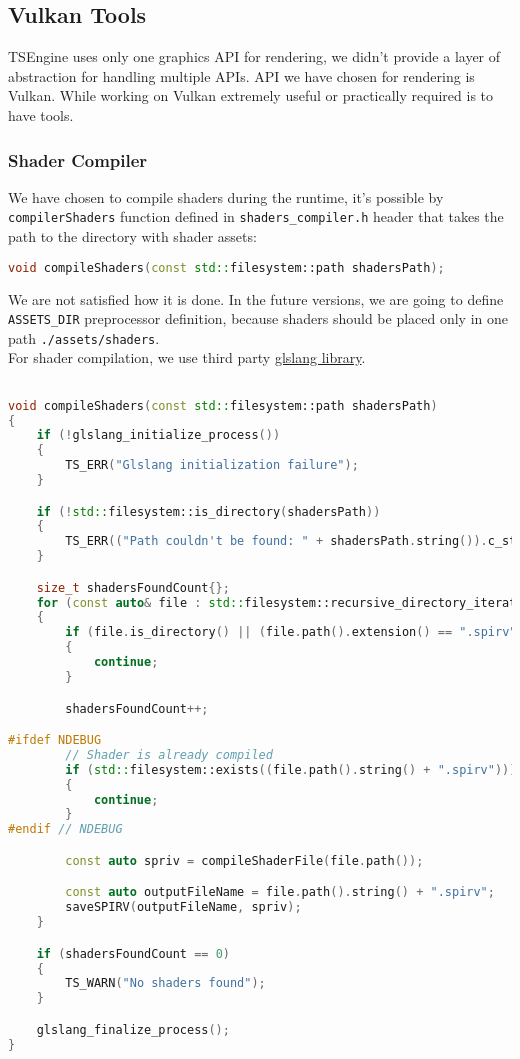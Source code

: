 \newpage

\subsection{Vulkan Tools}
TSEngine uses only one graphics API for rendering, we didn't provide a layer of abstraction for handling multiple APIs. API we have chosen for rendering is Vulkan. While working on Vulkan extremely useful or practically required is to have tools.
\subsubsection{Shader Compiler}
We have chosen to compile shaders during the runtime, it's possible by \texttt{compilerShaders} function defined in \texttt{shaders\_compiler.h} header that takes the path to the directory with shader assets: %
\begin{lstlisting}[language=c++, caption=Shaders Compiler header (./engine/src/vulkan\_tools/shaders\_compiler.h)]
void compileShaders(const std::filesystem::path shadersPath);
\end{lstlisting}
We are not satisfied how it is done. In the future versions, we are going to define \texttt{ASSETS\_DIR} preprocessor definition, because shaders should be placed only in one path \texttt{./assets/shaders}.\\
For shader compilation, we use third party \hyperref[lst:3rdparty]{glslang library}.
\begin{lstlisting}[language=c++, caption=Shader Compiler implementation(./engine/src/vulkan\_tools/shaders\_compiler.cpp)]

void compileShaders(const std::filesystem::path shadersPath)
{
    if (!glslang_initialize_process())
    {
        TS_ERR("Glslang initialization failure");
    }

    if (!std::filesystem::is_directory(shadersPath))
    {
        TS_ERR(("Path couldn't be found: " + shadersPath.string()).c_str());
    }

    size_t shadersFoundCount{};
    for (const auto& file : std::filesystem::recursive_directory_iterator(shadersPath))
    {
        if (file.is_directory() || (file.path().extension() == ".spirv") || (file.path().extension() == ".h"))
        {
            continue;
        }

        shadersFoundCount++;

#ifdef NDEBUG
        // Shader is already compiled
        if (std::filesystem::exists((file.path().string() + ".spirv")))
        {
            continue;
        }
#endif // NDEBUG

        const auto spriv = compileShaderFile(file.path());

        const auto outputFileName = file.path().string() + ".spirv";
        saveSPIRV(outputFileName, spriv);
    }

    if (shadersFoundCount == 0)
    {
        TS_WARN("No shaders found");
    }

    glslang_finalize_process();
}
\end{lstlisting}
